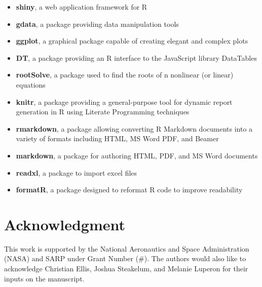 \documentclass[conference]{IEEEtran}
\begin{document}
\begin{itemize}
	\item {\textbf{shiny}, a web application framework for R}
	\item {\textbf{gdata}, a package providing data manipulation tools}
	\item {\textbf{ggplot}, a graphical package capable of creating elegant and complex plots}
	\item {\textbf{DT}, a package providing an R interface to the JavaScript library DataTables}
	\item {\textbf{rootSolve}, a package used to find the roots of n nonlinear (or linear) equations}
	\item {\textbf{knitr}, a package providing a general-purpose tool for dynamic report generation in R using Literate Programming techniques}
	\item {\textbf{rmarkdown}, a package allowing converting R Markdown documents into a variety of formats including HTML, MS Word PDF, and Beamer}
	\item {\textbf{markdown}, a package for authoring HTML, PDF, and MS Word documents}
	\item {\textbf{readxl}, a package to import excel files}
	\item {\textbf{formatR}, a package designed to reformat R code to improve readability}
 \end{itemize}

\section*{Acknowledgment}\label{sec:Ack}
This work is supported by the National Aeronautics and Space Administration (NASA) and SARP under Grant Number (\#). The authors would also like to acknowledge Christian Ellis, Joshua Steakelum, and Melanie Luperon for their inputs on the manuscript.




\end{document}
